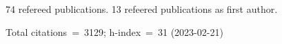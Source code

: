 74 refereed publications. 13 refeered publications as first author.

Total citations~=~3129; h-index~=~31 (2023-02-21)